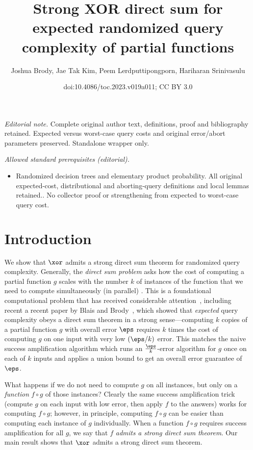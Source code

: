 \documentclass[11pt]{article}
\title{Strong XOR direct sum for expected randomized query complexity of partial functions}
\author{Joshua Brody, Jae Tak Kim, Peem Lerdputtipongporn, Hariharan Srinivasulu}
\date{doi:10.4086/toc.2023.v019a011; CC BY 3.0}
\numberwithin{equation}{section}
\theoremstyle{definition}
\theoremstyle{plain}
\begin{document}
\maketitle
\noindent\textit{Editorial note.} Complete original author text, definitions, proof and bibliography retained. Expected versus worst-case query costs and original error/abort parameters preserved. Standalone wrapper only.\par\medskip
\noindent\textit{Allowed standard prerequisites (editorial).}\begin{itemize}
\item Randomized decision trees and elementary product probability. All original expected-cost, distributional and aborting-query definitions and local lemmas retained.. No collector proof or strengthening from expected to worst-case query cost.
\end{itemize}\medskip
\section{Introduction}

We show that $\xor$ admits a strong direct sum theorem for randomized
query complexity.  Generally, the \emph{direct sum problem} asks how
the cost of computing a
partial %
function $g$ scales with the number $k$ of
instances of the function that we need to compute
simultaneously (in parallel) %
.
%
%
This is a
foundational computational problem that has received considerable
attention~\cite{ImpagliazzoRW94,BenAsherN95,NisanRS99, Shaltiel03,
  JainKS10, BenDavidK18,Drucker12, BlaisB19, BenDavidB20a, BenDavidB20b,
  BenDavidGKW20}, including recent %
a recent paper by %
Blais and
Brody~\cite{BlaisB19}, which showed that %
\emph{expected} %
%
query complexity obeys a direct sum theorem in a strong
%
sense---computing  %
$k$ copies of a
partial %
function $g$ with overall error
$\eps$ requires $k$ times the cost of computing $g$ on one input with
very low %
%
$(\eps/k)$ error.  %
This matches the naive success
amplification algorithm which runs an $\frac{\eps}{k}$-error algorithm for
$g$ once on each of $k$ inputs and applies a union bound to get an
overall error guarantee of $\eps$.

What happens if we %
do not %
need to compute $g$ on all instances, but
only on a \emph{function} $f\circ g$ of those instances?  Clearly the
same success amplification trick (compute $g$ on each input with low
error, then apply $f$ to the answers) works for computing $f\circ g$;
however, in principle, computing $f\circ g$ can be easier than
computing each instance of $g$ individually.  When a function
$f\circ g$ requires success amplification for all $g$, we say that $f$
\emph{admits a strong direct sum theorem}.  Our main result shows that
$\xor$ admits a strong direct sum theorem.
\end{document}

